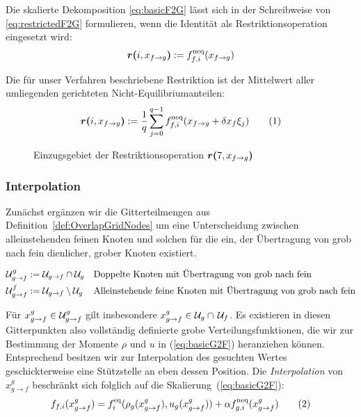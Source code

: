 Die skalierte Dekomposition \ref{eq:basicF2G} lässt sich in der Schreibweise von \ref{eq:restrictedF2G} formulieren, wenn die Identität als Restriktionsoperation eingesetzt wird: \[\boldsymbol{r(}{i}, {x_{f \to g}}\boldsymbol{)} := f_{f,i}^\text{neq}(x_{f \to g})\]

Die für unser Verfahren \cite[Kap.~3.3]{Lagrava12} beschriebene Restriktion ist der Mittelwert aller umliegenden gerichteten Nicht-Equilibriumanteilen:
\[\resarg{i}{x_{f \to g}} := \frac{1}{q} \sum_{j=0}^{q-1} f_{f,i}^\text{neq}(x_{f \to g} + \delta x_f \xi_j) \numberthis\label{eq:neqAvgRestrictionF2G}\]

\begin{figure}[H]
\centering

\caption{Einzugsgebiet der Restriktionsoperation \(\boldsymbol{r(}{7}, {x_{f \to g}}\boldsymbol{)}\)}
\end{figure}

\newpage
\subsubsection{Interpolation}\label{kap:Interpolation}

Zunächst ergänzen wir die Gitterteilmengen aus Definition~\ref{def:OverlapGridNodes} um eine Unterscheidung zwischen alleinstehenden feinen Knoten und solchen für die ein, der Übertragung von grob nach fein dienlicher, grober Knoten existiert.
\begin{Definition}
\begin{align*}
\mathcal{U}_{g \to f}^g &:= \mathcal{U}_{g \to f} \cap \mathcal{U}_g && \text{Doppelte Knoten mit Übertragung von grob nach fein} \\
\mathcal{U}_{g \to f}^f &:= \mathcal{U}_{g \to f} \setminus \mathcal{U}_g && \text{Alleinstehende feine Knoten mit Übertragung von grob nach fein}
\end{align*}
\end{Definition}

Für \(x_{g \to f}^g \in \mathcal{U}_{g \to f}^g\) gilt insbesondere \(x_{g \to f}^g \in \mathcal{U}_g \cap \, \mathcal{U}_f\). Es existieren in diesen Gitterpunkten also vollständig definierte grobe Verteilungsfunktionen, die wir zur Bestimmung der Momente \(\rho\) und \(u\) in (\ref{eq:basicG2F}) heranziehen können. Entsprechend besitzen wir zur Interpolation des gesuchten Wertes geschickterweise eine Stützstelle an eben dessen Position. Die \emph{Interpolation} von \(x_{g \to f}^g\) beschränkt sich folglich auf die Skalierung~(\ref{eq:basicG2F}):
\[f_{f,i}(x_{g \to f}^g) = f_i^\text{eq}(\rho_g(x_{g \to f}^g), u_g(x_{g \to f}^g)) + \alpha f_{g,i}^\text{neq}(x_{g \to f}^g) \numberthis\label{eq:expandedDirectG2F}\]

